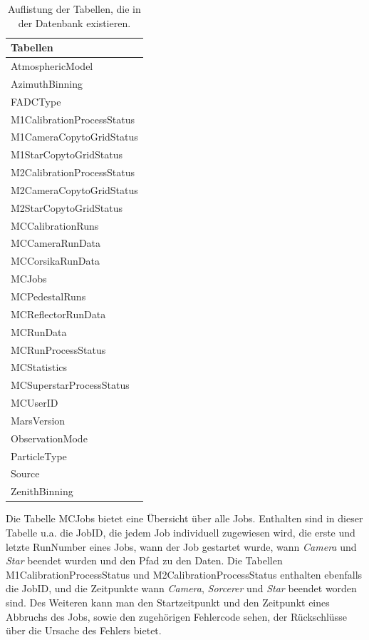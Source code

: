 \begin{table}[!h]
\centering
\caption{Auflistung der Tabellen, die in der Datenbank existieren.}
\label{MYSQL_Tabellen}
\begin{tabular}{l}
  \toprule
  Tabellen\\
  \midrule
  AtmosphericModel           \\
  AzimuthBinning             \\
  FADCType                   \\
  M1CalibrationProcessStatus \\
  M1CameraCopytoGridStatus   \\
  M1StarCopytoGridStatus     \\
  M2CalibrationProcessStatus \\
  M2CameraCopytoGridStatus   \\
  M2StarCopytoGridStatus     \\
  MCCalibrationRuns          \\
  MCCameraRunData            \\
  MCCorsikaRunData           \\
  MCJobs                     \\
  MCPedestalRuns             \\
  MCReflectorRunData         \\
  MCRunData                  \\
  MCRunProcessStatus         \\
  MCStatistics               \\
  MCSuperstarProcessStatus   \\
  MCUserID                   \\
  MarsVersion                \\
  ObservationMode            \\
  ParticleType               \\
  Source                     \\
  ZenithBinning   	     \\
  \bottomrule
\end{tabular}
\end{table}


Die Tabelle MCJobs bietet eine Übersicht über alle Jobs. 
Enthalten sind in dieser Tabelle u.a. die JobID, die jedem Job individuell zugewiesen wird, die erste und letzte RunNumber eines Jobs, wann der Job gestartet wurde, wann \textit{Camera} und \textit{Star} beendet wurden und den Pfad zu den Daten.\newline
Die Tabellen M1CalibrationProcessStatus und M2CalibrationProcessStatus enthalten ebenfalls die JobID, und die Zeitpunkte wann \textit{Camera}, \textit{Sorcerer} und \textit{Star} beendet worden sind. 
Des Weiteren kann man den Startzeitpunkt und den Zeitpunkt eines Abbruchs des Jobs, sowie den zugehörigen Fehlercode sehen, der Rückschlüsse über die Ursache des Fehlers bietet.

